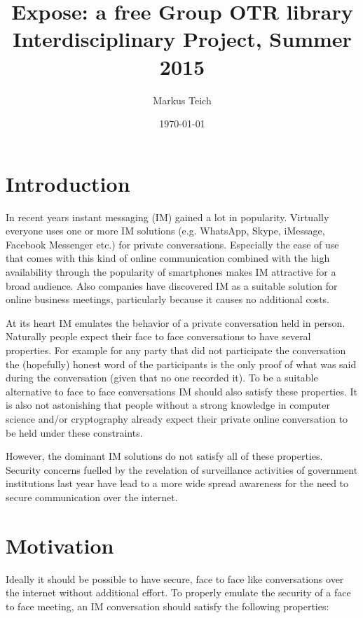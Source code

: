 

\title{Expose: a free Group OTR library \\ {\small Interdisciplinary Project, Summer 2015}}
\author{
	Markus Teich
}
\date{\today}



\maketitle


\section{Introduction}

In recent years instant messaging (IM) gained a lot in popularity. Virtually
everyone uses one or more IM solutions (e.g. WhatsApp, Skype, iMessage, Facebook
Messenger etc.) for private conversations. Especially the ease of use that comes
with this kind of online communication combined with the high availability
through the popularity of smartphones makes IM attractive for a broad audience.
Also companies have discovered IM as a suitable solution for online business
meetings, particularly because it causes no additional costs.

At its heart IM emulates the behavior of a private conversation held in person.
Naturally people expect their face to face conversations to have several
properties. For example for any party that did not participate the conversation
the (hopefully) honest word of the participants is the only proof of what was
said during the conversation (given that no one recorded it). To be a suitable
alternative to face to face conversations IM should also satisfy these
properties. It is also not astonishing that people without a strong knowledge in
computer science and/or cryptography already expect their private online
conversation to be held under these constraints.

However, the dominant IM solutions do not satisfy all of these properties.
Security concerns fuelled by the revelation of surveillance activities of
government institutions last year have lead to a more wide spread awareness for
the need to secure communication over the internet.


\section{Motivation}

Ideally it should be possible to have secure, face to face
like conversations over the internet without additional effort. To properly
emulate the security of a face to face meeting, an IM conversation should
satisfy the following properties:

